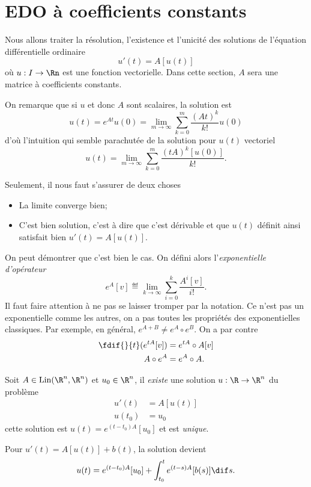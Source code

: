 

\DeclareMathOperator{\lin}{Lin}
\DeclareMathOperator{\spec}{spec}
\newcommand{\sol}{\mathcal{S}}

{}{}

\section{EDO à coefficients constants}
Nous allons traiter la résolution, l'existence et l'unicité des solutions
de l'équation différentielle ordinaire
\[ u'(t) = A[u(t)] \]
où $u:I\to\Rn$ est une fonction vectorielle.
Dans cette section, $A$ sera une matrice à coefficients constants.

On remarque que si $u$ et donc $A$ sont scalaires, la solution est
\[ u(t) = e^{At}u(0) = \lim_{m\to\infty} \sum_{k=0}^m\frac{(At)^k}{k!}u(0) \]
d'où l'intuition qui semble parachutée de la solution pour $u(t)$ vectoriel
\[ u(t) = \lim_{m\to\infty} \sum_{k=0}^m\frac{(tA)^k[u(0)]}{k!}. \]

Seulement, il nous faut s'assurer de deux choses
\begin{itemize}
  \item La limite converge bien;
  \item C'est bien solution,
    c'est à dire que c'est dérivable et que $u(t)$ définit
    ainsi satisfait bien $u'(t) = A[u(t)]$.
\end{itemize}

On peut démontrer que c'est bien le cas.
On défini alors l'\emph{exponentielle d'opérateur}
\[ e^{A}[v] \eqdef \lim_{k\to\infty} \sum_{i=0}^k \frac{A^i[v]}{i!}. \]
Il faut faire attention à ne pas se laisser tromper par la notation.
Ce n'est pas un exponentielle comme les autres, on a pas toutes les propriétés
des exponentielles classiques.
Par exemple, en général, $e^{A + B} \neq e^A \circ e^{B}$.
On a par contre
\begin{align*}
  \fdif{}{t}(e^{tA}[v]) & = e^{tA} \circ A[v]\\
  A \circ e^A & = e^A \circ A.
\end{align*}

\begin{myprop}
  Soit $A \in \lin(\R^n, \R^n)$ et $u_0 \in \R^n$,
  il \emph{existe} une solution
  $u:\R\to\R^n$ du problème
  \begin{align*}
    u'(t) & = A[u(t)]\\
    u(t_0) & = u_0
  \end{align*}
  cette solution est $u(t) = e^{(t-t_0)A}[u_0]$ et est \emph{unique}.
\end{myprop}
Pour $u'(t) = A[u(t)] + b(t)$, la solution devient
\[ u(t) = e^{(t-t_0)A}[u_0] + \int_{t_0}^t e^{(t-s)A}[b(s)]\dif s. \]

